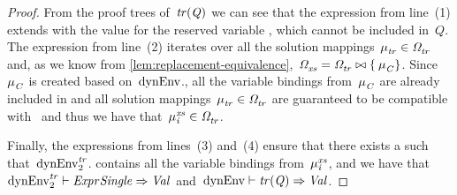 \begin{proof}
  From the proof trees of~$\mathit{tr}\!\left(\mathit{{Q}_{}}\right)$ we can see that the \LET expression from line~(1) extends \dyn
  with the value for the reserved variable , which cannot be included in~$Q$. 
  The \FOR expression from line~(2) iterates over all the solution mappings~${\mathit{\mu}}_{\mathit{tr}}^{\mathit{}} \in {\mathit{\Omega}}_{\mathit{tr}}^{\mathit{}}$
  and, as we know from \cref{lem:replacement-equivalence},~${\mathit{\Omega}}_{\mathit{xs}}^{\mathit{}} = {\mathit{\Omega}}_{\mathit{tr}}^{\mathit{}} \bowtie \left\{\:{\mathit{\mu}}_{\mathit{C}}^{\mathit{\:}}\right\}$.
  Since~${\mathit{\mu}}_{\mathit{C}}^{\mathit{}}$ is created based on~${\textrm{dynEnv}}$., all the variable bindings from~${\mathit{\mu}}_{\mathit{C}}^{\mathit{}}$ are already
  included in \dyn and all solution mappings~${\mathit{\mu}}_{\mathit{tr}}^{\mathit{}} \in {\mathit{\Omega}}_{\mathit{tr}}^{\mathit{}}$ are guaranteed to be compatible with~
  and thus we have that~${\mathit{\mu}}_{\mathit{i}}^{\mathit{xs}} \in {\mathit{\Omega}}_{\mathit{tr}}^{\mathit{}}$.

  Finally, the \LET expressions from lines~(3) and~(4) ensure that there exists a  such
  that~$\mathrm{dynEnv}_{2}^{\mathit{tr}}$. contains all the variable bindings from~${\mathit{\mu}}_{\mathit{i}}^{\mathit{xs}}$, and we have
  that~$\mathrm{dynEnv}_{2}^{\mathit{tr}} \vdash \mathit{Expr\-Single} \Rightarrow \mathit{{Val}_{}}$ and~${\textrm{dynEnv}} \vdash
  \mathit{tr}\!\left(\mathit{{Q}_{}}\right) \Rightarrow \mathit{{Val}_{}}$.
\end{proof}






